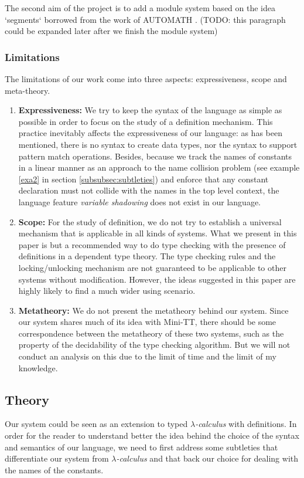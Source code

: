 \documentclass{article}
\theoremstyle{remark}
\begin{document}
The second aim of the project is to add a module system based on the idea `segments` borrowed from the work of AUTOMATH \cite{de1994survey}. (TODO: this paragraph could be expanded later after we finish the module system)

\subsubsection{Limitations}
The limitations of our work come into three aspects: expressiveness, scope and meta-theory.
\begin{enumerate}
\item \textbf{Expressiveness:} We try to keep the syntax of the language as simple as possible in order to focus on the study of a definition mechanism. This practice inevitably affects the expressiveness of our language: as has been mentioned, there is no syntax to create data types, nor the syntax to support pattern match operations. Besides, because we track the names of constants in a linear manner as an approach to the name collision problem (see example \ref{exa2} in section \ref{subsubsec:subtleties}) and enforce that any constant declaration must not collide with the names in the top level context, the language feature \emph{variable shadowing} does not exist in our language.
\item \textbf{Scope:} For the study of definition, we do not try to establish a universal mechanism that is applicable in all kinds of systems. What we present in this paper is but a recommended way to do type checking with the presence of definitions in a dependent type theory. The type checking rules and the locking/unlocking mechanism are not guaranteed to be applicable to other systems without modification. However, the ideas suggested in this paper are highly likely to find a much wider using scenario. 
\item \textbf{Metatheory:} We do not present the metatheory behind our system. Since our system shares much of its idea with Mini-TT, there should be some correspondence between the metatheory of these two systems, such as the property of the decidability of the type checking algorithm. But we will not conduct an analysis on this due to the limit of time and the limit of my knowledge.
\end{enumerate}

\subsection{Theory}
Our system could be seen as an extension to typed \emph{$\lambda$-calculus} with definitions. In order for the reader to understand better the idea behind the choice of the syntax and semantics of our language, we need to first address some subtleties that differentiate our system from \emph{$\lambda$-calculus} and that back our choice for dealing with the names of the constants.
\end{document}
